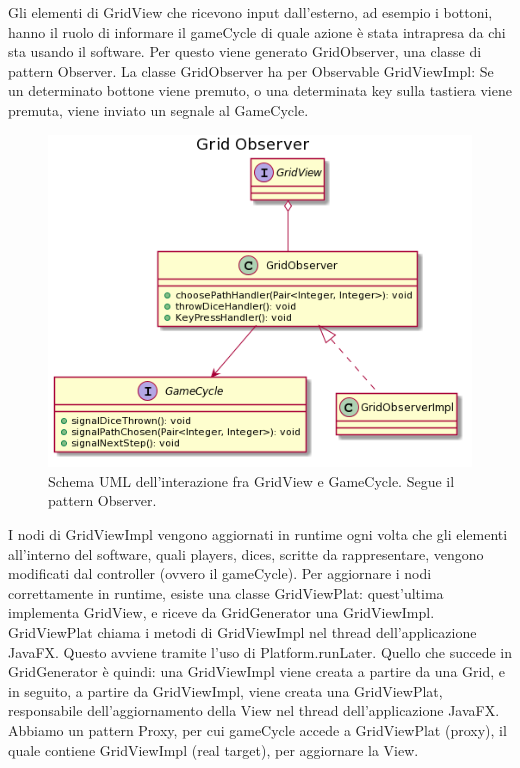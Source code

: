 \documentclass[a4paper,12pt]{report}
\begin{document}
Gli elementi di GridView che ricevono input dall’esterno, ad esempio i bottoni, hanno il ruolo di informare il gameCycle di quale azione è stata intrapresa da chi sta usando il software.
%
Per questo viene generato GridObserver, una classe di pattern Observer.
%
La classe GridObserver ha per Observable GridViewImpl: Se un determinato bottone viene premuto, o una determinata key sulla tastiera viene premuta, viene inviato un segnale al GameCycle.

\begin{figure}[h]
\centering{}
\includegraphics[width=\textwidth]{images/miriana/grid_observer.png}
\caption{Schema UML dell'interazione fra GridView e GameCycle. Segue il pattern Observer.}
\label{img:gridobserver}
\end{figure}

I nodi di GridViewImpl vengono aggiornati in runtime ogni volta che gli elementi all’interno del software, quali players, dices, scritte da rappresentare, vengono modificati dal controller (ovvero il gameCycle).
%
Per aggiornare i nodi correttamente in runtime, esiste una classe GridViewPlat: quest'ultima implementa GridView, e riceve da GridGenerator una GridViewImpl.
%
GridViewPlat chiama i metodi di GridViewImpl nel thread dell’applicazione JavaFX.
%
Questo avviene tramite l’uso di Platform.runLater.
%
Quello che succede in GridGenerator è quindi: una GridViewImpl viene creata a partire da una Grid, e in seguito, a partire da GridViewImpl, viene creata una GridViewPlat, responsabile dell’aggiornamento della View nel thread dell’applicazione JavaFX.
%
Abbiamo un pattern Proxy, per cui gameCycle accede a GridViewPlat (proxy), il quale contiene GridViewImpl (real target), per aggiornare la View.
\end{document}
